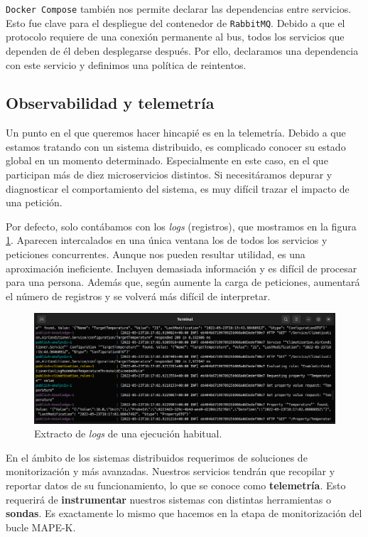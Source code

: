 \texttt{Docker Compose} también nos permite declarar las dependencias entre servicios. Esto fue clave para el despliegue del contenedor de \texttt{RabbitMQ}. Debido a que el protocolo requiere de una conexión permanente al bus\cite{johanssonPartRabbitMQBest2019}, todos los servicios que dependen de él deben desplegarse después. Por ello, declaramos una dependencia con este servicio y definimos una política de reintentos.

\subsection{Observabilidad y telemetría}

Un punto en el que queremos hacer hincapié es en la telemetría. Debido a que estamos tratando con un sistema distribuido, es complicado conocer su estado global en un momento determinado. Especialmente en este caso, en el que participan más de diez microservicios distintos. Si necesitáramos depurar y diagnosticar el comportamiento del sistema, es muy difícil trazar el impacto de una petición.

Por defecto, solo contábamos con los \emph{logs} (registros), que mostramos en la figura \ref{fig:console-logs}. Aparecen intercalados en una única ventana los de todos los servicios y peticiones concurrentes. Aunque nos pueden resultar utilidad, es una aproximación ineficiente. Incluyen demasiada información y es difícil de procesar para una persona. Además que, según aumente la carga de peticiones, aumentará el número de registros y se volverá más difícil de interpretar.

\begin{figure}[h]
  \centering
  \includegraphics[scale=1.45]{cap_despliegue/images/console-logs}
  \caption{Extracto de \emph{logs} de una ejecución habitual.}
  \label{fig:console-logs}
\end{figure}

En el ámbito de los sistemas distribuidos requerimos de soluciones de monitorización y  más avanzadas. \cite{newmanBuildingMicroservicesDesigning2021} Nuestros servicios tendrán que recopilar y reportar datos de su funcionamiento, lo que se conoce como \textbf{telemetría}. Esto requerirá de \textbf{instrumentar} nuestros sistemas con distintas herramientas o \textbf{sondas}. Es exactamente lo mismo que hacemos en la etapa de monitorización del bucle MAPE-K.

